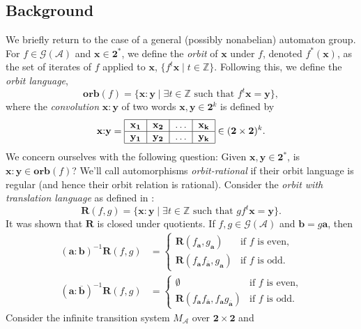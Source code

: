 \documentclass[12pt, letterpaper]{article}
\newcommand{\Z}{\mathbb Z}
\newcommand{\bin}{\mathbf 2}
\newcommand{\A}{\mathcal A}
\newcommand{\ch}[1]{\mathbf{#1}}
\newcommand{\res}[2]{{{#1}_{\ch{#2}}}}
\newcommand{\gp}{\mathcal G}
\newcommand{\R}{\mathbf R}
\newcommand{\f}[1]{\overline{#1}}
\newcommand{\orb}{\mathbf{orb}}
\begin{document}
\subsection{Background}
We briefly return to the case of a general (possibly nonabelian) automaton
group.  For $f \in \gp(\A)$ and $\ch{x} \in \bin^*$, we define the \emph{orbit}
of $\ch{x}$ under $f$, denoted $f^*(\ch{x})$, as the set of iterates of $f$
applied to $\ch{x}$, $\{f^t \ch{x} \mid t \in \Z\}$. Following this, we define
the \emph{orbit language},
\[
    \orb(f) = \{\ch{x} {:} \ch{y} \mid \exists t \in \Z \text{ such that }
    f^t \ch{x} = \ch{y}\},
\]
where the \emph{convolution} $\ch{x} {:} \ch{y}$ of two words $\ch{x}, \ch{y}
\in \bin^k$ is defined by
\[
    \ch{x} {:} \ch{y} = \begin{tabular}{|c|c|c|c|}
        \hline
        $\ch{x_1}$ & $\ch{x_2}$ & $\ldots$ & $\ch{x_k}$\\
        \hline
        $\ch{y_1}$ & $\ch{y_2}$ & $\ldots$ & $\ch{y_k}$\\
        \hline
    \end{tabular} \in (\bin \times \bin)^k.
\]
We concern ourselves with the following question: Given $\ch{x}, \ch{y} \in
\bin^*$, is $\ch{x} {:} \ch{y} \in \orb(f)$? We'll call automorphisms
\emph{orbit-rational} if their orbit language is regular (and hence their orbit
relation is rational).  Consider the \emph{orbit with translation language} as
defined in
\cite{jalc170214}:
\[
    \R(f,g) =
    \{\ch{x} {:} \ch{y} \mid \exists t \in \Z \text{ such that } g f^t
    \ch{x} = \ch{y}\}.
\]
It was shown that $\R$ is closed under quotients. If
$f, g \in \gp(\A)$ and $\ch{b} = g \ch{a}$, then
\begin{align*}
    (\ch{a} {:} \ch{b})^{-1} \R(f, g) &=
    \begin{cases}
        \R(\res{f}{a}, \res{g}{a}) & \text{if $f$ is even,}\\
        \R(\res{f}{a}\res{f}{\f{a}}, \res{g}{a}) & \text{if $f$ is odd.}
    \end{cases}\\
    (\ch{a} {:} \f{\ch{b}})^{-1} \R(f, g) &=
    \begin{cases}
        \emptyset & \text{if $f$ is even,}\\
        \R(\res{f}{a}\res{f}{\f{a}}, \res{f}{a}\res{g}{\f{a}}) &
        \text{if $f$ is odd.}
    \end{cases}
\end{align*}
Consider the infinite transition system $M_\A$ over $\bin \times \bin$ and
\end{document}
